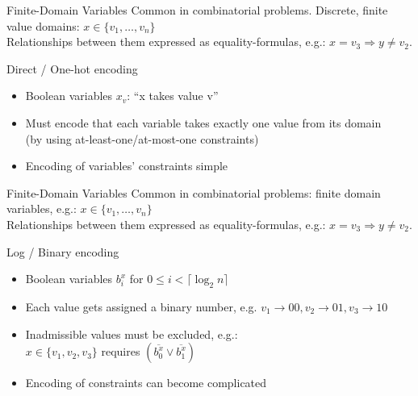 \documentclass[t]{sdqbeamer}
\begin{document}
\begin{frame}{Finite-Domain Variables}
	Common in combinatorial problems. Discrete, finite value domains: $x \in \{ v_1, \dots, v_n \}$\\[1ex]
	Relationships between them expressed as equality-formulas, e.g.: $x = v_3 \Rightarrow y \neq v_2$.\\[1ex]
	\begin{block}{Direct / One-hot encoding}
		\begin{itemize}\setlength{\itemsep}{1em}
		\item Boolean variables $x_v$: ``x takes value v''
		\item Must encode that each variable takes exactly one value from its domain\\
			(by using at-least-one/at-most-one constraints)
		\item Encoding of variables' constraints simple
		\end{itemize}
	\end{block}
\end{frame}
\begin{frame}{Finite-Domain Variables}
	Common in combinatorial problems: finite domain variables, e.g.: $x \in \{ v_1, \dots, v_n \}$\\[1ex]
	Relationships between them expressed as equality-formulas, e.g.: $x = v_3 \Rightarrow y \neq v_2$.\\[1ex]
	\begin{block}{Log / Binary encoding}
		\begin{itemize}\setlength{\itemsep}{1em}
		\item Boolean variables $b^x_i$ for $0 \leq i < \lceil \log_2{n} \rceil$
		\item Each value gets assigned a binary number, e.g. $v_1 \rightarrow 00, v_2 \rightarrow 01, v_3 \rightarrow 10$
		\item Inadmissible values must be excluded, e.g.: \\
			$x \in \{ v_1, v_2, v_3 \}$ requires $(\overline{b^x_0} \lor \overline{b^x_1})$
		\item Encoding of constraints can become complicated
		\end{itemize}
	\end{block}
\end{frame}
\end{document}
